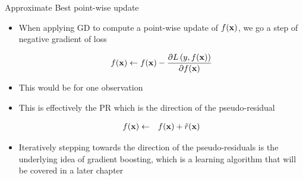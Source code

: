 \documentclass[11pt,compress,t,notes=noshow, xcolor=table]{beamer}
\begin{document}
\begin{vbframe}{Approximate Best point-wise update}

\begin{itemize}

\item When applying GD to compute a point-wise update of $f(\mathbf{x})$, 
we go a step of negative gradient of loss

$$
	f(\mathbf{x}) \leftarrow f(\mathbf{x}) - \frac{\partial L\left(y, f(\mathbf{x})\right)}{\partial f(\mathbf{x})} 
$$
\item This would be for one observation 

\item This is effectively the PR which is the direction of the pseudo-residual

\begin{eqnarray*}
	f(\mathbf{x}) &\leftarrow& f(\mathbf{x}) + \tilde{r}(\mathbf{x})\\ 
\end{eqnarray*}

\item Iteratively stepping towards the direction of the pseudo-residuals is the underlying idea of gradient boosting, which is a learning algorithm that will be covered in a later chapter

\end{itemize}

\end{vbframe}
\end{document}
